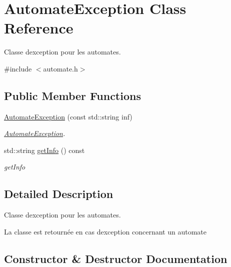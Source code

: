 \hypertarget{class_automate_exception}{}\section{Automate\+Exception Class Reference}
\label{class_automate_exception}


Classe d\textquotesingle{}exception pour les automates.  




{\ttfamily \#include $<$automate.\+h$>$}

\subsection*{Public Member Functions}
\begin{DoxyCompactItemize}
\item 
\mbox{\hyperlink{class_automate_exception_a29561c6d9cb3a8c963776eb667634e71}{Automate\+Exception}} (const std\+::string inf)
\begin{DoxyCompactList}\small\item\em \mbox{\hyperlink{class_automate_exception}{Automate\+Exception}}. \end{DoxyCompactList}\item 
std\+::string \mbox{\hyperlink{class_automate_exception_a7cd3843008b505a523231877bbf88699}{get\+Info}} () const
\begin{DoxyCompactList}\small\item\em get\+Info \end{DoxyCompactList}\end{DoxyCompactItemize}


\subsection{Detailed Description}
Classe d\textquotesingle{}exception pour les automates. 

La classe est retournée en cas d\textquotesingle{}exception concernant un automate 

\subsection{Constructor \& Destructor Documentation}
\mbox{\label{class_automate_exception_a29561c6d9cb3a8c963776eb667634e71}} 
